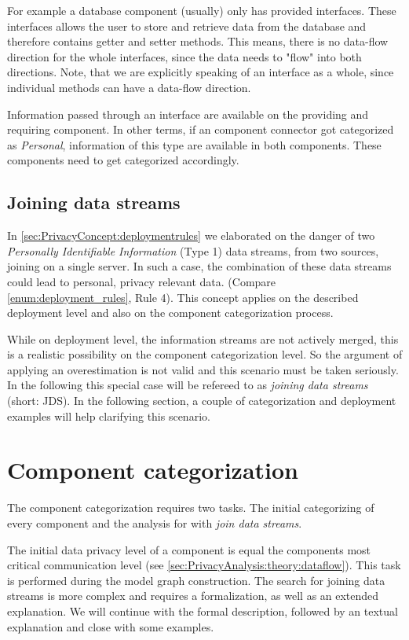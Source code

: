 For example a database component (usually) only has provided interfaces. These interfaces allows the user to store and retrieve data from the database and therefore contains getter and setter methods. This means, there is no data-flow direction for the whole interfaces, since the data needs to "flow" into both directions. Note, that we are explicitly speaking of an interface as a whole, since individual methods can have a data-flow direction.

Information passed through an interface are available on the providing and requiring component. In other terms, if an component connector got categorized as \textit{Personal}, information of this type are available in both components. These components need to get categorized accordingly.

\subsection{Joining data streams}
\label{sec:PrivacyAnalysis:theory:jds}
In \autoref{sec:PrivacyConcept:deploymentrules} we elaborated on the danger of two \textit{Personally Identifiable Information} (Type 1) data streams, from two sources, joining on a single server. In such a case, the combination of these data streams could lead to personal, privacy relevant data. (Compare \autoref{enum:deployment_rules}, Rule 4). This concept applies on the described deployment level and also on the component categorization process.

While on deployment level, the information streams are not actively merged, this is a realistic possibility on the component categorization level. So the argument of applying an overestimation is not valid and this scenario must be taken seriously. In the following this special case will be refereed to as \textit{joining data streams} (short: JDS). In the following section, a couple of categorization and deployment examples will help clarifying this scenario.


\section{Component categorization}
\label{sec:PrivacyAnalysis:categorization}

The component categorization requires two tasks. The initial categorizing of every component and the analysis for with \textit{join data streams}.

The initial data privacy level of a component is equal the components most critical communication level (see \autoref{sec:PrivacyAnalysis:theory:dataflow}). This task is performed during the model graph construction. The search for joining data streams is more complex and requires a formalization, as well as an extended explanation. We will continue with the formal description, followed by an textual explanation and close with some examples.

